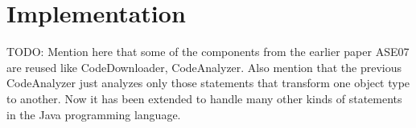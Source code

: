 \section{Implementation}
\label{sec:implementation}

TODO: Mention here that some of the components from the earlier
paper ASE07 are reused like CodeDownloader, CodeAnalyzer. Also mention
that the previous CodeAnalyzer just analyzes only those statements
that transform one object type to another. Now it has been extended
to handle many other kinds of statements in the Java programming language.